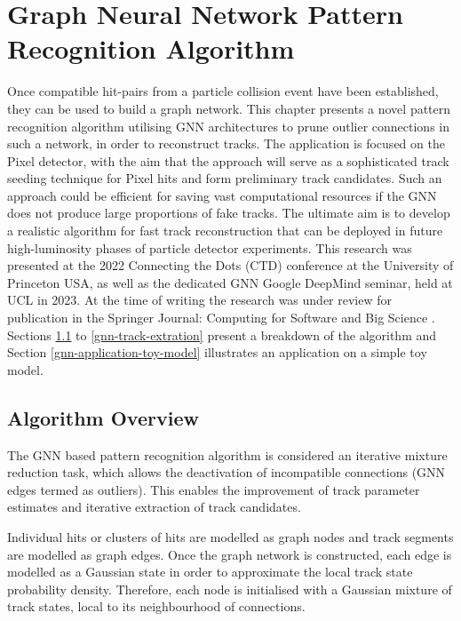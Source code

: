 
\chapter{Graph Neural Network Pattern Recognition Algorithm}\label{chapter-5}

Once compatible hit-pairs from a particle collision event have been established, they can be used to build a graph network. This chapter presents a novel pattern recognition algorithm utilising GNN architectures to prune outlier connections in such a network, in order to reconstruct tracks. The application is focused on the Pixel detector, with the aim that the approach will serve as a sophisticated track seeding technique for Pixel hits and form preliminary track candidates. Such an approach could be efficient for saving vast computational resources if the GNN does not produce large proportions of fake tracks. The ultimate aim is to develop a realistic algorithm for fast track reconstruction that can be deployed in future high-luminosity phases of particle detector experiments. This research was presented at the 2022 Connecting the Dots (CTD) conference at the University of Princeton USA, as well as the dedicated GNN Google DeepMind seminar, held at UCL in 2023. At the time of writing the research was under review for publication in the Springer Journal: Computing for Software and Big Science \cite{Lad_2023_gnn}. Sections \ref{gnn-algorithm-overview} to \ref{gnn-track-extration} present a breakdown of the algorithm and Section \ref{gnn-application-toy-model} illustrates an application on a simple toy model.


\section{Algorithm Overview}
\label{gnn-algorithm-overview}
The GNN based pattern recognition algorithm is considered an iterative mixture reduction task, which allows the deactivation of incompatible connections (GNN edges termed as outliers). This enables the improvement of track parameter estimates and iterative extraction of track candidates. 

Individual hits or clusters of hits are modelled as graph nodes and track segments are modelled as graph edges. Once the graph network is constructed, each edge is modelled as a Gaussian state in order to approximate the local track state probability density. Therefore, each node is initialised with a Gaussian mixture of track states, local to its neighbourhood of connections.


